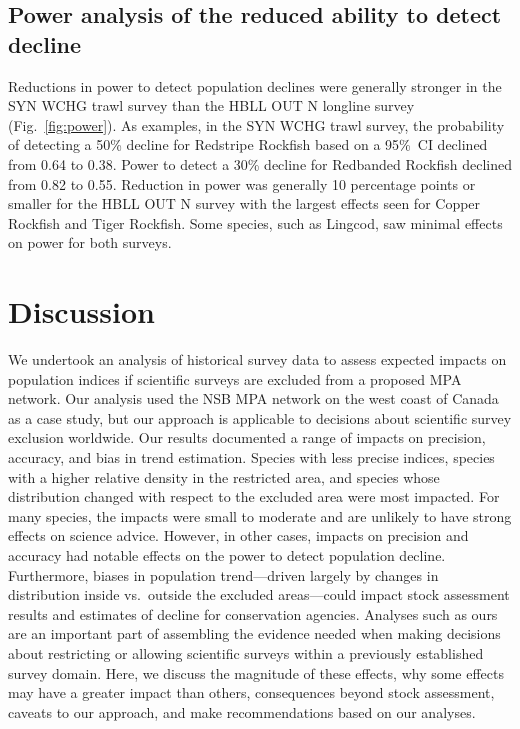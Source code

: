 \documentclass[12pt]{article}
\begin{document}
\begin{spacing}{1.4}
\subsection*{Power analysis of the reduced ability to detect decline}

Reductions in power to detect population declines were generally stronger in the SYN WCHG trawl survey than the HBLL OUT N longline survey (Fig.~\ref{fig:power}).
As examples, in the SYN WCHG trawl survey, the probability of detecting a 50\% decline for Redstripe Rockfish based on a 95\%~CI declined from 0.64 to 0.38.
Power to detect a 30\% decline for Redbanded Rockfish declined from 0.82 to 0.55.
Reduction in power was generally 10 percentage points or smaller for the HBLL OUT N survey with the largest effects seen for Copper Rockfish and Tiger Rockfish.
Some species, such as Lingcod, saw minimal effects on power for both surveys.

\section*{Discussion}

We undertook an analysis of historical survey data to assess expected impacts on population indices if scientific surveys are excluded from a proposed MPA network.
Our analysis used the NSB MPA network on the west coast of Canada as a case study, but our approach is applicable to decisions about scientific survey exclusion worldwide.
Our results documented a range of impacts on precision, accuracy, and bias in trend estimation.
Species with less precise indices, species with a higher relative density in the restricted area, and species whose distribution changed with respect to the excluded area were most impacted.
For many species, the impacts were small to moderate and are unlikely to have strong effects on science advice.
However, in other cases, impacts on precision and accuracy had notable effects on the power to detect population decline.
Furthermore, biases in population trend---driven largely by changes in distribution inside vs.\ outside the excluded areas---could impact stock assessment results and estimates of decline for conservation agencies.
Analyses such as ours are an important part of assembling the evidence needed when making decisions about restricting or allowing scientific surveys within a previously established survey domain.
Here, we discuss the magnitude of these effects, why some effects may have a greater impact than others, consequences beyond stock assessment, caveats to our approach, and make recommendations based on our analyses.


\end{spacing}
\end{document}

